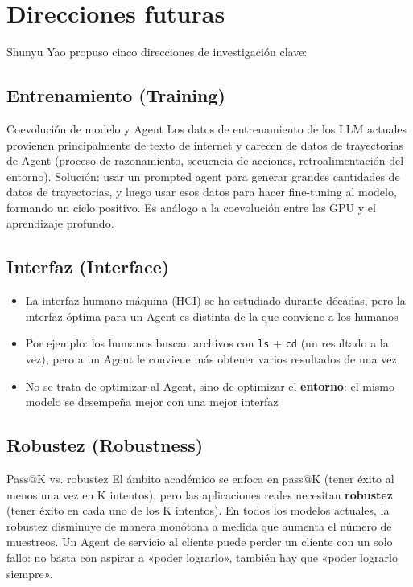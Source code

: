 \section{Direcciones futuras}

Shunyu Yao propuso cinco direcciones de investigación clave:

\subsection{Entrenamiento (Training)}

\begin{importantbox}{Coevolución de modelo y Agent}
Los datos de entrenamiento de los LLM actuales provienen principalmente de texto de internet y carecen de datos de trayectorias de Agent (proceso de razonamiento, secuencia de acciones, retroalimentación del entorno). Solución: usar un prompted agent para generar grandes cantidades de datos de trayectorias, y luego usar esos datos para hacer fine-tuning al modelo, formando un ciclo positivo. Es análogo a la coevolución entre las GPU y el aprendizaje profundo.
\end{importantbox}

\subsection{Interfaz (Interface)}

\begin{itemize}
    \item La interfaz humano-máquina (HCI) se ha estudiado durante décadas, pero la interfaz óptima para un Agent es distinta de la que conviene a los humanos
    \item Por ejemplo: los humanos buscan archivos con \texttt{ls} + \texttt{cd} (un resultado a la vez), pero a un Agent le conviene más obtener varios resultados de una vez
    \item No se trata de optimizar al Agent, sino de optimizar el \textbf{entorno}: el mismo modelo se desempeña mejor con una mejor interfaz
\end{itemize}

\subsection{Robustez (Robustness)}

\begin{warningbox}{Pass@K vs. robustez}
El ámbito académico se enfoca en pass@K (tener éxito al menos una vez en K intentos), pero las aplicaciones reales necesitan \textbf{robustez} (tener éxito en cada uno de los K intentos). En todos los modelos actuales, la robustez disminuye de manera monótona a medida que aumenta el número de muestreos. Un Agent de servicio al cliente puede perder un cliente con un solo fallo: no basta con aspirar a «poder lograrlo», también hay que «poder lograrlo siempre».
\end{warningbox}

